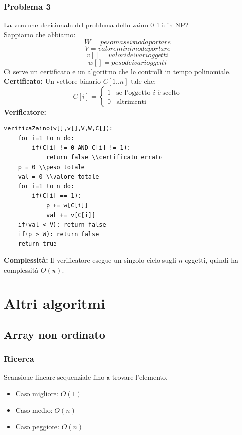 \documentclass[a4paper,12pt]{article}
\let\oldsection\section
\renewcommand{\section}{\clearpage\oldsection}
\begin{document}
\subsubsection{Problema 3}
La versione decisionale del problema dello zaino 0-1 è in NP?\\
Sappiamo che abbiamo:
\[
W = peso massimo da portare
\]
\[
V = valore minimo da portare
\]
\[
v[] = valori dei vari oggetti
\]
\[
w[] = peso dei vari oggetti
\]
Ci serve un certificato e un algoritmo che lo controlli in tempo polinomiale.\\
\textbf{Certificato:}
Un vettore binario $C[1..n]$ tale che:
\[
C[i] =
\begin{cases}
1 & \text{se l'oggetto } i \text{ è scelto} \\
0 & \text{altrimenti}
\end{cases}
\]
\textbf{Verificatore:}
\begin{lstlisting}
verificaZaino(w[],v[],V,W,C[]):
    for i=1 to n do:
        if(C[i] != 0 AND C[i] != 1):
            return false \\certificato errato
    p = 0 \\peso totale
    val = 0 \\valore totale
    for i=1 to n do:
        if(C[i] == 1):
            p += w[C[i]]
            val += v[C[i]]
    if(val < V): return false
    if(p > W): return false
    return true
\end{lstlisting}
\textbf{Complessità:}
Il verificatore esegue un singolo ciclo sugli $n$ oggetti, quindi ha complessità $O(n)$.

\section{Altri algoritmi}
\subsection{Array non ordinato}

\subsubsection{Ricerca}
Scansione lineare sequenziale fino a trovare l’elemento.
\begin{itemize}
    \item Caso migliore: $O(1)$
    \item Caso medio: $O(n)$
    \item Caso peggiore: $O(n)$
\end{itemize}
\end{document}
